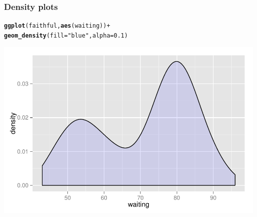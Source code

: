 \documentclass{beamer}\usepackage[]{graphicx}\usepackage[]{color}
\makeatletter
\newcommand{\hlnum}[1]{\textcolor[rgb]{0.686,0.059,0.569}{#1}}%
\newcommand{\hlstr}[1]{\textcolor[rgb]{0.192,0.494,0.8}{#1}}%
\newcommand{\hlopt}[1]{\textcolor[rgb]{0,0,0}{#1}}%
\newcommand{\hlstd}[1]{\textcolor[rgb]{0.345,0.345,0.345}{#1}}%
\newcommand{\hlkwc}[1]{\textcolor[rgb]{0.333,0.667,0.333}{#1}}%
\newcommand{\hlkwd}[1]{\textcolor[rgb]{0.737,0.353,0.396}{\textbf{#1}}}%
\newenvironment{kframe}{%
 \def\at@end@of@kframe{}%
 \ifinner\ifhmode%
  \def\at@end@of@kframe{\end{minipage}}%
  \begin{minipage}{\columnwidth}%
 \fi\fi%
 \def\FrameCommand##1{\hskip\@totalleftmargin \hskip-\fboxsep
 \colorbox{shadecolor}{##1}\hskip-\fboxsep
     \hskip-\linewidth \hskip-\@totalleftmargin \hskip\columnwidth}%
 \MakeFramed {\advance\hsize-\width
   \@totalleftmargin\z@ \linewidth\hsize
   \@setminipage}}%
 {\par\unskip\endMakeFramed%
 \at@end@of@kframe}
\newenvironment{knitrout}{}{} %
\makeatother
\begin{document}
\begin{frame}[fragile]
\frametitle{Density plots}
\begin{knitrout}\footnotesize
{}\color{fgcolor}\begin{kframe}
\begin{alltt}
\hlkwd{ggplot}\hlstd{(faithful,} \hlkwd{aes}\hlstd{(waiting))} \hlopt{+}
\hlkwd{geom_density}\hlstd{(}\hlkwc{fill} \hlstd{=} \hlstr{"blue"}\hlstd{,} \hlkwc{alpha} \hlstd{=} \hlnum{0.1}\hlstd{)}
\end{alltt}
\end{kframe}

{\centering \includegraphics[width=.75\linewidth]{figure/densityonefove_} 

}



\end{knitrout}

\end{frame}

\end{document}
